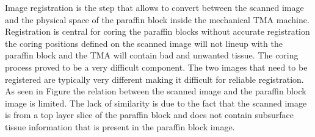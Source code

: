 \documentclass[a4paper,10pt,oneside]{article}
\begin{document}
Image registration is the step that allows to convert between the scanned image and the physical space of the paraffin block inside the mechanical TMA machine. Registration is central for coring the paraffin blocks without accurate registration the coring positions defined on the scanned image will not lineup with the paraffin block and the TMA will contain bad and unwanted tissue. The coring process proved to be a very difficult component. The two images that need to be registered are typically very different making it difficult for reliable registration. As seen in Figure the relation between the scanned image and the paraffin block image is limited. The lack of similarity is due to the fact that the scanned image is from a top layer slice of the paraffin block and does not contain subsurface tissue information that is present in the paraffin block image.
\end{document}
